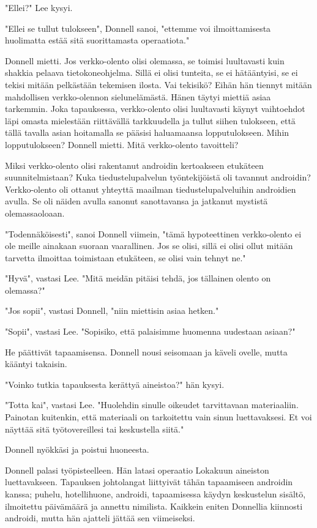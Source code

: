 "Ellei?" Lee kysyi.


"Ellei se tullut tulokseen", Donnell sanoi, "ettemme voi ilmoittamisesta huolimatta estää sitä suorittamasta operaatiota."


Donnell mietti. Jos verkko-olento olisi olemassa, se toimisi luultavasti kuin shakkia pelaava tietokoneohjelma. Sillä ei olisi tunteita, se ei hätääntyisi, se ei tekisi mitään pelkästään tekemisen ilosta. Vai tekisikö? Eihän hän tiennyt mitään mahdollisen verkko-olennon sielunelämästä. Hänen täytyi miettiä asiaa tarkemmin. Joka tapauksessa, verkko-olento olisi luultavasti käynyt vaihtoehdot läpi omasta mielestään riittävällä tarkkuudella ja tullut siihen tulokseen, että tällä tavalla asian hoitamalla se pääsisi haluamaansa lopputulokseen. Mihin lopputulokseen? Donnell mietti. Mitä verkko-olento tavoitteli?


Miksi verkko-olento olisi rakentanut androidin kertoakseen etukäteen suunnitelmistaan? Kuka tiedustelupalvelun työntekijöistä oli tavannut androidin? Verkko-olento oli ottanut yhteyttä maailman tiedustelupalveluihin androidien avulla. Se oli näiden avulla sanonut sanottavansa ja jatkanut mystistä olemassaoloaan.


"Todennäköisesti", sanoi Donnell viimein, "tämä hypoteettinen verkko-olento ei ole meille ainakaan suoraan vaarallinen. Jos se olisi, sillä ei olisi ollut mitään tarvetta ilmoittaa toimistaan etukäteen, se olisi vain tehnyt ne."


"Hyvä", vastasi Lee. "Mitä meidän pitäisi tehdä, jos tällainen olento on olemassa?"


"Jos sopii", vastasi Donnell, "niin miettisin asiaa hetken."


"Sopii", vastasi Lee. "Sopisiko, että palaisimme huomenna uudestaan asiaan?"


He päättivät tapaamisensa. Donnell nousi seisomaan ja käveli ovelle, mutta kääntyi takaisin.


"Voinko tutkia tapauksesta kerättyä aineistoa?" hän kysyi.


"Totta kai", vastasi Lee. "Huolehdin sinulle oikeudet tarvittavaan materiaaliin. Painotan kuitenkin, että materiaali on tarkoitettu vain sinun luettavaksesi. Et voi näyttää sitä työtovereillesi tai keskustella siitä."


Donnell nyökkäsi ja poistui huoneesta.




\psep Donnell palasi työpisteelleen. Hän latasi operaatio Lokakuun aineiston luettavakseen. Tapauksen johtolangat liittyivät tähän tapaamiseen androidin kanssa; puhelu, hotellihuone, androidi, tapaamisessa käydyn keskustelun sisältö, ilmoitettu päivämäärä ja annettu nimilista. Kaikkein eniten Donnellia kiinnosti androidi, mutta hän ajatteli jättää sen viimeiseksi.


